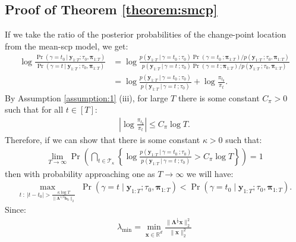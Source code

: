 \subsection{Proof of Theorem \ref{theorem:smcp}}
\label{app:localization-smcp}

If we take the ratio of the posterior probabilities of the change-point location from the mean-scp model, we get:
\begin{align*}
    \log \frac{\Pr(\gamma = t_0  \:|\: \mathbf{y}_{1:T} ; \tau_0,\boldsymbol{\pi}_{1:T})}{\Pr(\gamma = t  \:|\: \mathbf{y}_{1:T} \:; \tau_0,\boldsymbol{\pi}_{1:T})} &=  \log \frac{p(\mathbf{y}_{1:T} \:|\:\gamma = t_0 \:; \tau_0)\Pr(\gamma = t_0 \:; \boldsymbol{\pi}_{1:T})/ p(\mathbf{y}_{1:T}\:;\tau_0,\boldsymbol{\pi}_{1:T})}{p(\mathbf{y}_{1:T} \:|\:\gamma = t \:; \tau_0)\Pr(\gamma = t \:;\boldsymbol{\pi}_{1:T})/ p(\mathbf{y}_{1:T}\:;\tau_0,\boldsymbol{\pi}_{1:T})} \tag{Bayes' rule} \\
    &= \log \frac{p(\mathbf{y}_{1:T} \:|\:\gamma = t_0 \:; \tau_0)}{p(\mathbf{y}_{1:T} \:|\:\gamma = t \:; \tau_0)} + \log \frac{\pi_{t_0}}{\pi_t}.
\end{align*}
By Assumption \ref{assumption:1} (iii), for large $T$ there is some constant $C_\pi > 0$ such that for all $t \in [T]$: 
\begin{align}\label{eq:thm1-prior-bd}
    \left|\log \frac{\pi_{t_0}}{\pi_t}\right| \leq C_\pi \log T.
\end{align}
Therefore, if we can show that there is some constant $\kappa > 0$ such that:
\begin{align}
    \lim_{T\to\infty}\Pr\left(\bigcap_{t\in\mathcal{T}_\kappa}\left\{ \log \frac{p(\mathbf{y}_{1:T} \:|\:\gamma = t_0 \:; \tau_0)}{p(\mathbf{y}_{1:T} \:|\:\gamma = t \:; \tau_0)} > C_\pi \log T\right\}\right) = 1 \label{eq:thm1-result}
\end{align}
then with probability approaching one as $T \to \infty$ we will have:
\begin{align*}
    \max_{t\::\: |t - t_0| > \frac{\kappa\log T}{\lVert\boldsymbol{\Lambda}^{1/2}\mathbf{b}_0\rVert_2}} \; \Pr(\gamma = t  \;|\; \mathbf{y}_{1:T} ; \tau_0,\boldsymbol{\pi}_{1:T}) < \Pr(\gamma = t_0  \;|\; \mathbf{y}_{1:T} ; \tau_0,\boldsymbol{\pi}_{1:T}).
\end{align*}
Since: 
\begin{align*}
    \lambda_{\min} = \min_{\mathbf{x}\in\mathbb{R}^d}\frac{\lVert\boldsymbol{\Lambda}^{\frac{1}{2}}\mathbf{x}\rVert_2^2}{\lVert\mathbf{x}\rVert_2^2}
\end{align*}
